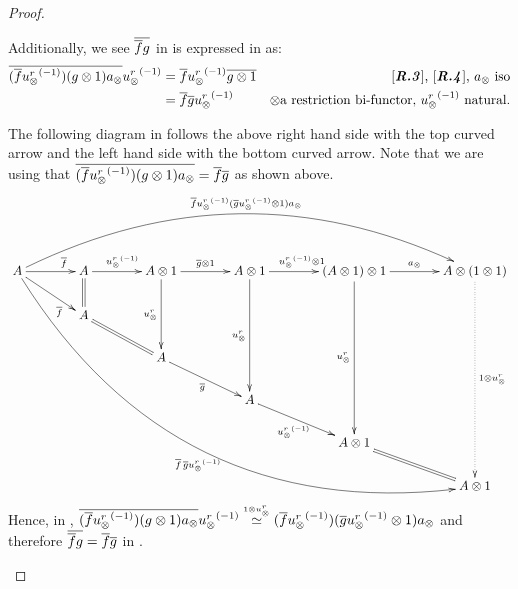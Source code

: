 \begin{proof}
\begin{description}
      Additionally, we see $\overline{\overline{f} g}$ in \Xt is expressed in \X as:
      \begin{align*}
        \overline{(\overline{f} {u_{\otimes}^r}^{(-1)}) (g\otimes 1) a_{\otimes}} {u_{\otimes}^r}^{(-1)}
        & = \overline{f} {u_{\otimes}^r}^{(-1)} \overline{g\otimes 1} & \text{\ensuremath{[\text{\emph{\bfseries {R}.{3}}}]}, \ensuremath{[\text{\emph{\bfseries {R}.{4}}}]}, }a_{\otimes} \text{ iso} \\
        & = \overline{f} \overline{g} {u_{\otimes}^r}^{(-1)} & \otimes 
          \text{a restriction bi-functor, }{\ensuremath{u_{\otimes}^r}}^{(-1)}\text{ natural.}
      \end{align*}

      The following diagram in \X follows the above right hand side with the top curved arrow and
      the left hand side with the bottom curved arrow. Note that we are using that
      $\overline{(\overline{f} {u_{\otimes}^r}^{(-1)}) (g\otimes 1) a_{\otimes}} = \overline{f}\overline{g}$ as shown above.
      \[
        \xymatrix @C=38pt @R=20pt{
          A \ar@/^45pt/[rrrrr]^{\restr{f} \inv{\usr}(\restr{g} \inv{\usr} \* 1)a_{\*}}
            \ar@/_65pt/[dddddrrrrr]_{\restr{f}\, \restr{g}\inv{\usr}}
            \ar[r]^(.7){\restr{f}}
            \ar[dr]_(.7){\restr{f}}
            &A \ar[r]^{\inv{\usr}}
            \ar@{=}[d]
            &A \* 1 \ar[r]^{\restr{g}\*1}
            \ar[dd]_{\usr}
            &A \* 1 \ar[r]^{\inv{\usr}\* 1}
            \ar[ddd]_{\usr}
            &(A \* 1) \* 1 \ar[r]^{a_{\*}}
            \ar[dddd]_{\usr}
            & A \* (1\*1) \ar@{.>}[ddddd]^{1\*\usr}\\
          &A\ar@{=}[dr]\\
          &&A \ar[dr]_{\restr{g}}\\
          &&&A \ar[dr]_{\inv\usr}\\
          &&&&A\*1 \ar@{=}[dr]\\
          &&&&&A\*1
        }
      \]
      Hence, in \X, $\overline{(\overline{f} {u_{\otimes}^r}^{(-1)}) (g\otimes 1) a_{\otimes}} {u_{\otimes}^r}^{(-1)} \overset{\scriptscriptstyle 1\otimes u_{\otimes}^r}{\simeq}
      (\overline{f} {u_{\otimes}^r}^{(-1)}) (\overline{g} {u_{\otimes}^r}^{(-1)}\otimes 1) a_{\otimes}$ and therefore $\overline{\overline{f} g} =
      \overline{f} \overline{g}$ in \Xt.




\end{description}
\end{proof}
